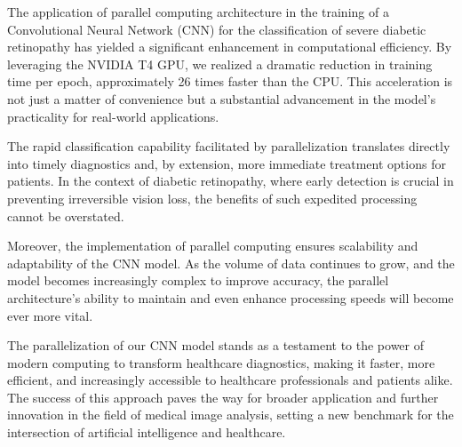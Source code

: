 The application of parallel computing architecture in the training of a Convolutional Neural Network (CNN) for the classification of severe diabetic retinopathy has yielded a significant enhancement in computational efficiency. By leveraging the NVIDIA T4 GPU, we realized a dramatic reduction in training time per epoch, approximately 26 times faster than the CPU. This acceleration is not just a matter of convenience but a substantial advancement in the model's practicality for real-world applications.

The rapid classification capability facilitated by parallelization translates directly into timely diagnostics and, by extension, more immediate treatment options for patients. In the context of diabetic retinopathy, where early detection is crucial in preventing irreversible vision loss, the benefits of such expedited processing cannot be overstated.

Moreover, the implementation of parallel computing ensures scalability and adaptability of the CNN model. As the volume of data continues to grow, and the model becomes increasingly complex to improve accuracy, the parallel architecture's ability to maintain and even enhance processing speeds will become ever more vital.

The parallelization of our CNN model stands as a testament to the power of modern computing to transform healthcare diagnostics, making it faster, more efficient, and increasingly accessible to healthcare professionals and patients alike. The success of this approach paves the way for broader application and further innovation in the field of medical image analysis, setting a new benchmark for the intersection of artificial intelligence and healthcare.